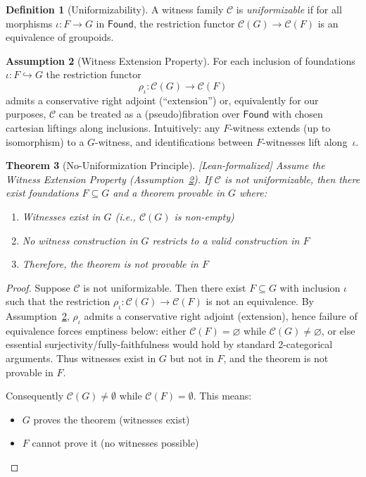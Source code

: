 \documentclass[11pt]{article}
\theoremstyle{plain}
\newtheorem{theorem}{Theorem}[section]
\theoremstyle{definition}
\newtheorem{definition}[theorem]{Definition}
\newtheorem{assumption}[theorem]{Assumption}
\newcommand{\Found}{\mathsf{Found}}
\newcommand{\leanok}{\textsf{\textcolor{green!70!black}{[Lean-formalized]}}}
\begin{document}
\begin{definition}[Uniformizability]\label{def:uniformizable}
A witness family $\mathcal{C}$ is \emph{uniformizable} if for all morphisms $\iota: F \to G$ in $\Found$, the restriction functor $\mathcal{C}(G) \to \mathcal{C}(F)$ is an equivalence of groupoids.
\end{definition}

\begin{assumption}[Witness Extension Property]\label{assump:WEP}
For each inclusion of foundations $\iota:F\hookrightarrow G$ the restriction functor
\[
  \rho_{\iota}:\mathcal C(G)\longrightarrow \mathcal C(F)
\]
admits a conservative right adjoint (``extension'') or, equivalently for our purposes, $\mathcal C$ can be treated as a (pseudo)fibration over $\Found$ with chosen cartesian liftings along inclusions. Intuitively: any $F$-witness extends (up to isomorphism) to a $G$-witness, and identifications between $F$-witnesses lift along~$\iota$.
\end{assumption}

\begin{theorem}[No-Uniformization Principle]\label{thm:no-unif} \leanok
Assume the Witness Extension Property (Assumption~\ref{assump:WEP}). 
If $\mathcal{C}$ is not uniformizable, then there exist foundations $F \subseteq G$ and a theorem provable in $G$ where:
\begin{enumerate}
\item Witnesses exist in $G$ (i.e., $\mathcal{C}(G)$ is non-empty)
\item No witness construction in $G$ restricts to a valid construction in $F$
\item Therefore, the theorem is not provable in $F$
\end{enumerate}
\end{theorem}

\begin{proof}
Suppose $\mathcal{C}$ is not uniformizable. Then there exist $F \subseteq G$ with inclusion $\iota$ such that the restriction $\rho_\iota:\mathcal{C}(G) \to \mathcal{C}(F)$ is not an equivalence. By Assumption~\ref{assump:WEP}, $\rho_\iota$ admits a conservative right adjoint (extension), hence failure of equivalence forces emptiness below: either $\mathcal{C}(F)=\varnothing$ while $\mathcal{C}(G)\neq\varnothing$, or else essential surjectivity/fully-faithfulness would hold by standard 2-categorical arguments. Thus witnesses exist in $G$ but not in $F$, and the theorem is not provable in $F$.

Consequently $\mathcal{C}(G) \neq \emptyset$ while $\mathcal{C}(F) = \emptyset$. This means:
\begin{itemize}
\item $G$ proves the theorem (witnesses exist)
\item $F$ cannot prove it (no witnesses possible)
\end{itemize}
\end{proof}
\end{document}
